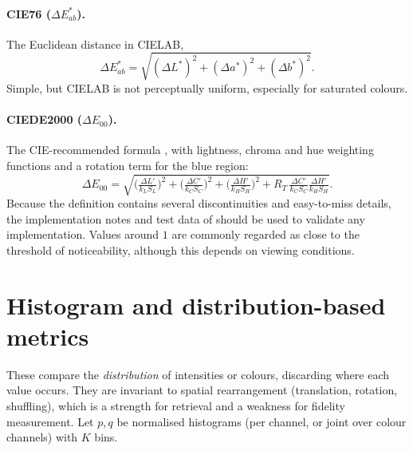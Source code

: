 \paragraph{CIE76 ($\Delta E^*_{ab}$).} The Euclidean distance in CIELAB,
\[
\Delta E^*_{ab}=\sqrt{(\Delta L^*)^2+(\Delta a^*)^2+(\Delta b^*)^2}.
\]
Simple, but CIELAB is not perceptually uniform, especially for saturated colours.

\paragraph{CIEDE2000 ($\Delta E_{00}$).} The CIE-recommended formula \citep{cie142}, with lightness, chroma and hue weighting functions and a rotation term for the blue region:
\[
\Delta E_{00}=\sqrt{\Big(\tfrac{\Delta L'}{k_LS_L}\Big)^2+\Big(\tfrac{\Delta C'}{k_CS_C}\Big)^2+\Big(\tfrac{\Delta H'}{k_HS_H}\Big)^2+R_T\,\tfrac{\Delta C'}{k_CS_C}\tfrac{\Delta H'}{k_HS_H}}.
\]
Because the definition contains several discontinuities and easy-to-miss details, the implementation notes and test data of \citet{sharma2005} should be used to validate any implementation. Values around $1$ are commonly regarded as close to the threshold of noticeability, although this depends on viewing conditions.

\section{Histogram and distribution-based metrics}

These compare the \emph{distribution} of intensities or colours, discarding where each value occurs. They are invariant to spatial rearrangement (translation, rotation, shuffling), which is a strength for retrieval and a weakness for fidelity measurement. Let $p,q$ be normalised histograms (per channel, or joint over colour channels) with $K$ bins.

